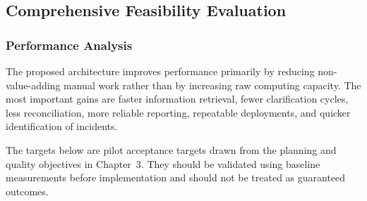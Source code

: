 \documentclass[12pt,a4paper]{report}
\begin{document}
\subsection{Comprehensive Feasibility Evaluation}
\label{subsec:comprehensive-feasibility}

\subsubsection{Performance Analysis}\label{sec:feas-performance}

The proposed architecture improves performance primarily by reducing non-value-adding manual
work rather than by increasing raw computing capacity. The most important gains are faster
information retrieval, fewer clarification cycles, less reconciliation, more reliable reporting,
repeatable deployments, and quicker identification of incidents.

The targets below are pilot acceptance targets drawn from the planning and quality objectives in
Chapter~3. They should be validated using baseline measurements before implementation and
should not be treated as guaranteed outcomes.
\end{document}
